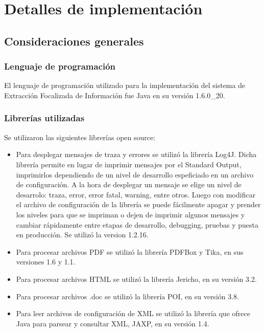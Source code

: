\chapter{Detalles de implementación} \label{chap:implementacion}

\section{Consideraciones generales} \label{sect:implementacion-consideraciones}

\subsection{Lenguaje de programación} \label{sect:implementacion-lenguaje}

El lenguaje de programación utilizado para la implementación del sistema de Extracción Focalizada de Información fue Java en su versión 1.6.0\_20. \\

\subsection{Librerías utilizadas} \label{sect:implementacion-librerias}


Se utilizaron las siguientes librerías open source: 

\begin{itemize}
\item Para desplegar mensajes de traza y errores se utilizó la librería Log4J. Dicha librería permite en lugar de imprimir mensajes por el Standard Output, imprimirlos dependiendo de un nivel de desarrollo espeficiado en un archivo de configuración. A la hora de desplegar un mensaje se elige un nivel de desarrolo: traza, error, error fatal, warning, entre otros. Luego con modificar el archivo de configuración de la librería se puede fácilmente apagar y prender los niveles para que se impriman o dejen de imprimir algunos mensajes y cambiar rápidamente entre etapas de desarrollo, debugging, pruebas y puesta en producción. Se utilizó la version 1.2.16.
\item Para procesar archivos PDF se utilizó la librería PDFBox y Tika, en sus versiones 1.6 y 1.1.
\item Para procesar archivos HTML se utilizó la librería Jericho, en su versión 3.2.
\item Para procesar archivos .doc se utilizó la librería POI, en su versión 3.8.
\item Para leer archivos de configuración de XML se utilizó la librería que ofrece Java para parsear y consultar XML, JAXP, en su versión 1.4.

\end{itemize}

